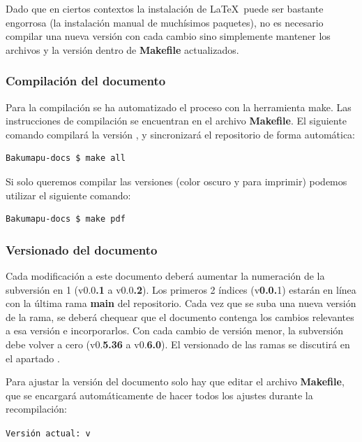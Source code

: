 Dado que en ciertos contextos la instalación de \LaTeX\ puede ser bastante engorrosa (la instalación manual de muchísimos paquetes), no es necesario compilar una nueva versión con cada cambio sino simplemente mantener los archivos  y la versión dentro de \textbf{Makefile} actualizados.

\subsubsection{Compilación del documento}
Para la compilación se ha automatizado el proceso con la herramienta  make. Las instrucciones de compilación se encuentran en el archivo \textbf{Makefile}. El siguiente comando compilará la versión ,  y sincronizará el repositorio de forma automática:

\begin{lstlisting}
Bakumapu-docs $ make all
\end{lstlisting}

Si solo queremos compilar las versiones  (color oscuro y para imprimir) podemos utilizar el siguiente comando:

\begin{lstlisting}
Bakumapu-docs $ make pdf
\end{lstlisting}

\subsubsection{Versionado del documento}\label{flujo:versionado-del-documento}
Cada modificación a este documento deberá aumentar la numeración de la subversión en 1 (v0.0\textbf{.1} a v0.0\textbf{.2}). Los primeros 2 índices (v\textbf{0.0.}1) estarán en línea con la última rama \textbf{main} del repositorio. Cada vez que se suba una nueva versión de la rama, se deberá chequear que el documento contenga los cambios relevantes a esa versión e incorporarlos. Con cada cambio de versión menor, la subversión debe volver a cero (v0.\textbf{5.36} a v0.\textbf{6.0}). El versionado de las ramas se discutirá en el apartado .

Para ajustar la versión del documento solo hay que editar el archivo \textbf{Makefile}, que se encargará automáticamente de hacer todos los ajustes durante la recompilación:
\begin{center}
\texttt{Versión actual: v\docversion}
\end{center}

